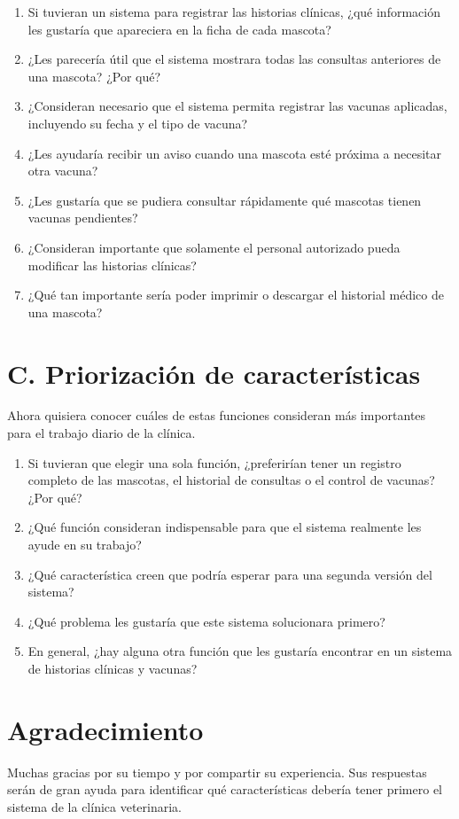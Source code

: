 \documentclass[11pt,a4paper]{article}
\begin{document}
\begin{enumerate}[leftmargin=*, start=9]
  \item Si tuvieran un sistema para registrar las historias clínicas, ¿qué información les gustaría que apareciera en la ficha de cada mascota?
  \item ¿Les parecería útil que el sistema mostrara todas las consultas anteriores de una mascota? ¿Por qué?
  \item ¿Consideran necesario que el sistema permita registrar las vacunas aplicadas, incluyendo su fecha y el tipo de vacuna?
  \item ¿Les ayudaría recibir un aviso cuando una mascota esté próxima a necesitar otra vacuna?
  \item ¿Les gustaría que se pudiera consultar rápidamente qué mascotas tienen vacunas pendientes?
  \item ¿Consideran importante que solamente el personal autorizado pueda modificar las historias clínicas?
  \item ¿Qué tan importante sería poder imprimir o descargar el historial médico de una mascota?
\end{enumerate}

\section*{C. Priorización de características}

Ahora quisiera conocer cuáles de estas funciones consideran más importantes para el trabajo diario de la clínica.

\begin{enumerate}[leftmargin=*, start=16]
  \item Si tuvieran que elegir una sola función, ¿preferirían tener un registro completo de las mascotas, el historial de consultas o el control de vacunas? ¿Por qué?
  \item ¿Qué función consideran indispensable para que el sistema realmente les ayude en su trabajo?
  \item ¿Qué característica creen que podría esperar para una segunda versión del sistema?
  \item ¿Qué problema les gustaría que este sistema solucionara primero?
  \item En general, ¿hay alguna otra función que les gustaría encontrar en un sistema de historias clínicas y vacunas?
\end{enumerate}

\section*{Agradecimiento}

Muchas gracias por su tiempo y por compartir su experiencia. Sus respuestas serán de gran ayuda para identificar qué características debería tener primero el sistema de la clínica veterinaria.
\end{document}
